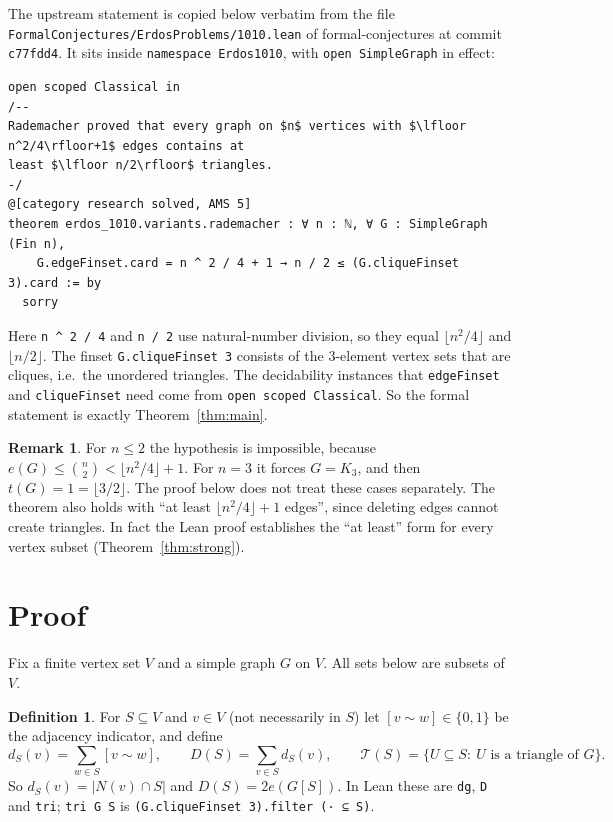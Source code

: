 \documentclass[11pt]{amsart}
\theoremstyle{plain}
\theoremstyle{definition}
\newtheorem{definition}[theorem]{Definition}
\newtheorem{remark}[theorem]{Remark}
\newcommand{\Tri}{\mathcal{T}}
\newcommand{\adj}{\sim}
\newcommand{\lean}[1]{\texttt{#1}}
\begin{document}
The upstream statement is copied below verbatim from the file
\nolinkurl{FormalConjectures/ErdosProblems/1010.lean} of formal-conjectures at commit
\texttt{c77fdd4}. It sits inside \lean{namespace Erdos1010}, with \lean{open SimpleGraph} in
effect:
\begin{lstlisting}[basicstyle=\ttfamily\scriptsize]
open scoped Classical in
/--
Rademacher proved that every graph on $n$ vertices with $\lfloor n^2/4\rfloor+1$ edges contains at
least $\lfloor n/2\rfloor$ triangles.
-/
@[category research solved, AMS 5]
theorem erdos_1010.variants.rademacher : ∀ n : ℕ, ∀ G : SimpleGraph (Fin n),
    G.edgeFinset.card = n ^ 2 / 4 + 1 → n / 2 ≤ (G.cliqueFinset 3).card := by
  sorry
\end{lstlisting}
Here \lean{n \textasciicircum{} 2 / 4} and \lean{n / 2} use natural-number division, so they equal
$\lfloor n^2/4\rfloor$ and $\lfloor n/2\rfloor$. The finset \lean{G.cliqueFinset 3} consists of
the $3$-element vertex sets that are cliques, i.e.\ the unordered triangles. The decidability
instances that \lean{edgeFinset} and \lean{cliqueFinset} need come from \lean{open scoped Classical}.
So the formal statement is exactly Theorem~\ref{thm:main}.

\begin{remark}\label{rem:small}
For $n\le 2$ the hypothesis is impossible, because $e(G)\le\binom n2<\lfloor n^2/4\rfloor+1$. For
$n=3$ it forces $G=K_3$, and then $t(G)=1=\lfloor 3/2\rfloor$. The proof below does not treat
these cases separately. The theorem also holds with ``at least $\lfloor n^2/4\rfloor+1$ edges'',
since deleting edges cannot create triangles. In fact the Lean proof establishes the ``at least''
form for every vertex subset (Theorem~\ref{thm:strong}).
\end{remark}

\section{Proof}

Fix a finite vertex set $V$ and a simple graph $G$ on $V$. All sets below are subsets of $V$.

\begin{definition}\label{def:notation}
For $S\subseteq V$ and $v\in V$ (not necessarily in $S$) let $[v\adj w]\in\{0,1\}$ be the
adjacency indicator, and define
\[
  d_S(v)=\sum_{w\in S}[v\adj w],\qquad D(S)=\sum_{v\in S}d_S(v),\qquad
  \Tri(S)=\{U\subseteq S:\ U \text{ is a triangle of } G\}.
\]
So $d_S(v)=|N(v)\cap S|$ and $D(S)=2e(G[S])$. In Lean these are \lean{dg}, \lean{D} and
\lean{tri}; \lean{tri G S} is \lean{(G.cliqueFinset 3).filter (· ⊆ S)}.
\end{definition}
\end{document}
